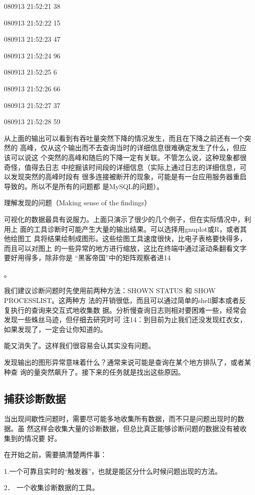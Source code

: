 {080913 21:52:21 38

080913 21:52:22 15

080913 21:52:23 47

080913 21:52:24 96

080913 21:52:25 6

080913 21:52:26 66

080913 21:52:27 37

080913 21:52:28 59

从上面的输出可以看到有吞吐量突然下降的情况发生，而且在下降之前还有一个突然的
高峰，仅从这个输出而不去查询当时的详细信息很难确定发生了什么，但应该可以说这
个突然的高峰和随后的下降一定有关联。不管怎么说，这种现象都很奇怪，值得去日志
中挖掘该时间段的详细信息（实际上通过日志的详细信息，可以发现突然的高峰时段有
很多连接被断开的现象，可能是有一台应用服务器重启导致的。所以不是所有的问题都
是MySQL的问题）。

理解发现的问题（Making sense of the findings）

可视化的数据最具有说服力。上面只演示了很少的几个例子，但在实际情况中，利用上
面的工具诊断时可能产生大量的输出结果。可以选择用gnuplot或R，或者其他绘图工
具将结果绘制成图形。这些绘图工具速度很快，比电子表格要快得多，而且可以对图上
的一些异常的地方进行缩放，这比在终端中通过滚动条翻看文字要好用得多，除非你是
“黑客帝国”中的矩阵观察者进14

。

我们建议诊断问题时先使用前两种方法：SHOWN STATUS 和 SHOW PROCESSLIST。这两种方
法的开销很低，而且可以通过简单的shell脚本或者反复执行的查询来交互式地收集数
据。分析慢查询日志则相对要困难一些，经常会发现一些蛛丝马迹，但仔细去研究时可
注14：到目前为止我们还没发现红衣女，如果发现了，一定会让你知道的。

能又消失了。这样我们很容易会认其实没有问题。

发现输出的图形异常意味着什么？通常来说可能是查询在某个地方排队了，或者某种查
询的量突然飙升了。接下来的任务就是找出这些原因。

\subsection{捕获诊断数据}
当出现间歇性问题时，需要尽可能多地收集所有数据，而不只是问题出现时的数据。虽
然这样会收集大量的诊断数据，但总比真正能够诊断问题的数据没有被收集到的情况要
好。

在开始之前，需要搞清楚两件事：

1.一个可靠且实时的“触发器”，也就是能区分什么时候问题出现的方法。

2． 一个收集诊断数据的工具。

}
